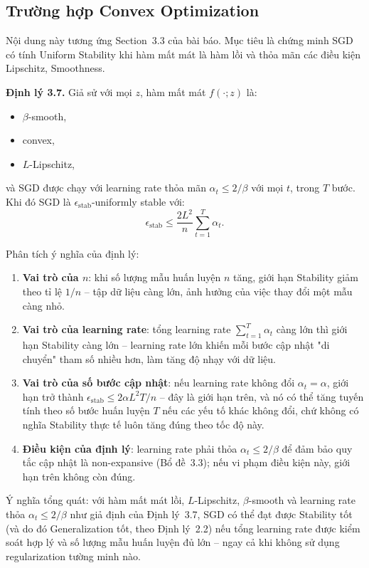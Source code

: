 \subsection{Trường hợp Convex Optimization}
\label{subsec:convex}

Nội dung này tương ứng Section~3.3 của bài báo. Mục tiêu là chứng minh SGD có tính Uniform Stability khi hàm mất mát là hàm lồi và thỏa mãn các điều kiện Lipschitz, Smoothness.

\textbf{Định lý 3.7.} Giả sử với mọi $z$, hàm mất mát $f(\cdot; z)$ là:
\begin{itemize}
    \item $\beta$-smooth,
    \item convex,
    \item $L$-Lipschitz,
\end{itemize}
và SGD được chạy với learning rate thỏa mãn $\alpha_t \leq 2/\beta$ với mọi $t$, trong $T$ bước. Khi đó SGD là $\epsilon_{\mathrm{stab}}$-uniformly stable với:
\[
\boxed{\epsilon_{\mathrm{stab}} \leq \frac{2L^2}{n}\sum_{t=1}^{T}\alpha_t.}
\]

Phân tích ý nghĩa của định lý:
\begin{enumerate}
    \item \textbf{Vai trò của $n$}: khi số lượng mẫu huấn luyện $n$ tăng, giới hạn Stability giảm theo tỉ lệ $1/n$ -- tập dữ liệu càng lớn, ảnh hưởng của việc thay đổi một mẫu càng nhỏ.
    \item \textbf{Vai trò của learning rate}: tổng learning rate $\sum_{t=1}^T \alpha_t$ càng lớn thì giới hạn Stability càng lớn -- learning rate lớn khiến mỗi bước cập nhật "di chuyển" tham số nhiều hơn, làm tăng độ nhạy với dữ liệu.
    \item \textbf{Vai trò của số bước cập nhật}: nếu learning rate không đổi $\alpha_t = \alpha$, giới hạn trở thành $\epsilon_{\mathrm{stab}} \leq 2\alpha L^2 T/n$ -- đây là giới hạn trên, và nó có thể tăng tuyến tính theo số bước huấn luyện $T$ nếu các yếu tố khác không đổi, chứ không có nghĩa Stability thực tế luôn tăng đúng theo tốc độ này.
    \item \textbf{Điều kiện của định lý}: learning rate phải thỏa $\alpha_t \leq 2/\beta$ để đảm bảo quy tắc cập nhật là non-expansive (Bổ đề~3.3); nếu vi phạm điều kiện này, giới hạn trên không còn đúng.
\end{enumerate}
Ý nghĩa tổng quát: với hàm mất mát lồi, $L$-Lipschitz, $\beta$-smooth và learning rate thỏa $\alpha_t \le 2/\beta$ như giả định của Định lý~3.7, SGD có thể đạt được Stability tốt (và do đó Generalization tốt, theo Định lý~2.2) nếu tổng learning rate được kiểm soát hợp lý và số lượng mẫu huấn luyện đủ lớn -- ngay cả khi không sử dụng regularization tường minh nào.

